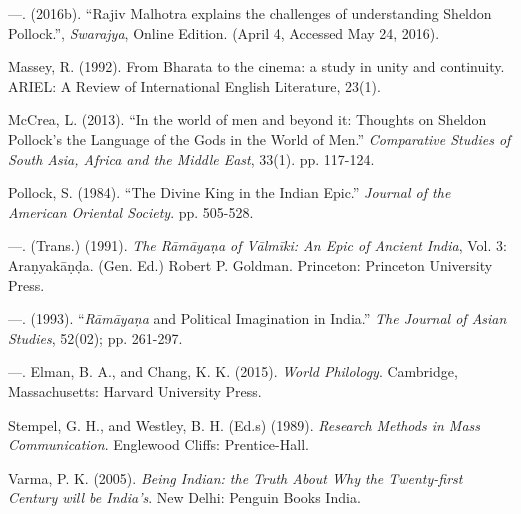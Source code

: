 \begin{thebibliography}{99}
  —. (2016b). “Rajiv Malhotra explains the challenges of understanding Sheldon Pollock.”, \textit{Swarajya}, Online Edition. (April 4, Accessed May 24, 2016).

  Massey, R. (1992). From Bharata to the cinema: a study in unity and continuity. ARIEL: A Review of International English Literature, 23(1).

  McCrea, L. (2013). “In the world of men and beyond it: Thoughts on Sheldon Pollock’s the Language of the Gods in the World of Men.” \textit{Comparative Studies of South Asia, Africa and the Middle East}, 33(1). pp. 117-124.

  Pollock, S. (1984). “The Divine King in the Indian Epic.” \textit{Journal of the American Oriental Society}. pp. 505-528.

  —. (Trans.) (1991). \textit{The Rāmāyaṇa of Vālmīki: An Epic of Ancient India}, Vol. 3: Araṇyakāṇḍa. (Gen. Ed.) Robert P. Goldman. Princeton: Princeton University Press.

  —. (1993). “\textit{Rāmāyaṇa} and Political Imagination in India.” \textit{The Journal of Asian Studies}, 52(02); pp. 261-297.

  —. Elman, B. A., and Chang, K. K. (2015). \textit{World Philology}. Cambridge, Massachusetts: Harvard University Press.

  Stempel, G. H., and Westley, B. H. (Ed.s) (1989). \textit{Research Methods in Mass Communication}. Englewood Cliffs: Prentice-Hall.

  Varma, P. K. (2005). \textit{Being Indian: the Truth About Why the Twenty-first Century will be India's}. New Delhi: Penguin Books India.

 \end{thebibliography}

\theendnotes

